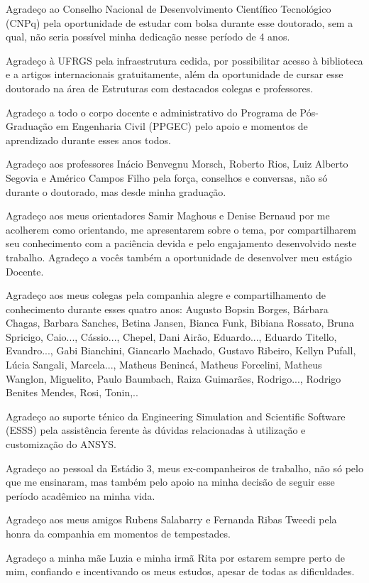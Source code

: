 Agradeço ao Conselho Nacional de Desenvolvimento Científico Tecnológico (CNPq) pela oportunidade de estudar com bolsa durante esse doutorado, sem a qual, não seria possível minha dedicação nesse período de 4 anos.

Agradeço à UFRGS pela infraestrutura cedida, por possibilitar acesso à biblioteca e a artigos internacionais gratuitamente, além da oportunidade de cursar esse doutorado na área de Estruturas com destacados colegas e professores.

Agradeço a todo o corpo docente e administrativo do Programa de Pós-Graduação em Engenharia Civil (PPGEC) pelo apoio e momentos de aprendizado durante esses anos todos.

Agradeço aos professores Inácio Benvegnu Morsch, Roberto Rios, Luiz Alberto Segovia e Américo Campos Filho pela força, conselhos e conversas, não só durante o doutorado, mas desde minha graduação.

Agradeço aos meus orientadores Samir Maghous e Denise Bernaud por me acolherem como orientando, me apresentarem sobre o tema, por compartilharem seu conhecimento com a paciência devida e pelo engajamento desenvolvido neste trabalho. Agradeço a vocês também a oportunidade de desenvolver meu estágio Docente.

Agradeço aos meus colegas pela companhia alegre e compartilhamento de conhecimento durante esses quatro anos: Augusto Bopsin Borges, Bárbara Chagas, Barbara Sanches, Betina Jansen, Bianca Funk, Bibiana Rossato, Bruna Spricigo, Caio..., Cássio..., Chepel, Dani Airão, Eduardo..., Eduardo Titello, Evandro..., Gabi Bianchini, Giancarlo Machado, Gustavo Ribeiro, Kellyn Pufall, Lúcia Sangali, Marcela..., Matheus Benincá, Matheus Forcelini, Matheus Wanglon, Miguelito, Paulo Baumbach, Raiza Guimarães, Rodrigo..., Rodrigo Benites Mendes, Rosi, Tonin,..

Agradeço ao suporte ténico da Engineering Simulation and Scientific Software (ESSS) pela assistência ferente às dúvidas relacionadas à utilização e customização do ANSYS.

Agradeço ao pessoal da Estádio 3, meus ex-companheiros de trabalho, não só pelo que me ensinaram, mas também pelo apoio na minha decisão de seguir esse período acadêmico na minha vida.

Agradeço aos meus amigos Rubens Salabarry e Fernanda Ribas Tweedi pela honra da companhia em momentos de tempestades.

Agradeço a minha mãe Luzia e minha irmã Rita por estarem sempre perto de mim, confiando e incentivando os meus estudos, apesar de todas as dificuldades.



